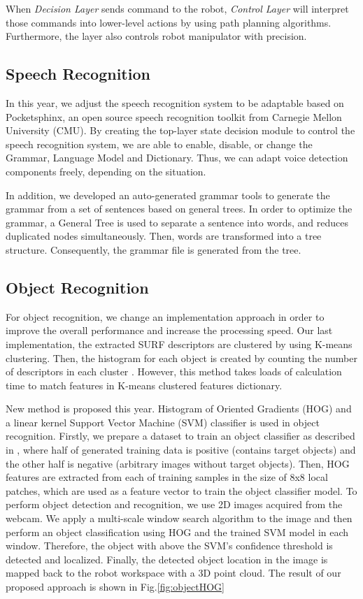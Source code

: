 \documentclass{llncs}
\begin{document}
When \textit{Decision Layer} sends command to the robot, \textit{Control Layer} will interpret those commands into lower-level actions by using path planning algorithms. Furthermore, the layer also controls robot manipulator with precision.

\subsection{Speech Recognition}

In this year, we adjust the speech recognition system to be adaptable based on Pocketsphinx, an open source speech recognition toolkit from Carnegie Mellon University (CMU). By creating the top-layer state decision module to control the speech recognition system, we are able to enable, disable, or change the Grammar, Language Model and Dictionary. Thus, we can adapt voice detection components freely, depending on the situation.
 
In addition, we developed an auto-generated grammar tools to generate the grammar from a set of sentences based on general trees. In order to optimize the grammar, a General Tree is used to separate a sentence into words, and reduces duplicated nodes simultaneously. Then, words are transformed into a tree structure. Consequently, the grammar file is generated from the tree.

\subsection{Object Recognition}
    
For object recognition, we change an implementation approach in order to improve the overall performance and increase the processing speed. Our last implementation, the extracted SURF descriptors are clustered by using K-means clustering. Then, the histogram for each object is created by counting the number of descriptors in each cluster \cite{obj_rec_surf}. However, this method takes loads of calculation time to match features in K-means clustered features dictionary.
 
New method is proposed this year. Histogram of Oriented Gradients (HOG) and a linear kernel Support Vector Machine (SVM) classifier is used in object recognition. Firstly, we prepare a dataset to train an object classifier as described in \cite{traininghaar}, where half of generated training data is positive (contains target objects) and the other half is negative (arbitrary images without target objects). Then, HOG features are extracted from each of training samples in the size of 8x8 local patches, which are used as a feature vector to train the object classifier model. To perform object detection and recognition, we use 2D images acquired from the webcam. We apply a multi-scale window search algorithm to the image and then perform an object classification using HOG and the trained SVM model in each window. Therefore, the object with above the SVM’s confidence threshold is detected and localized. Finally, the detected object location in the image is mapped back to the robot workspace with a 3D point cloud. The result of our proposed approach is shown in Fig.\ref{fig:objectHOG}
\end{document}
